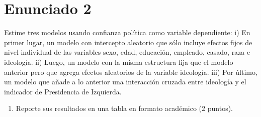 \documentclass[
  12pt,
  a4paper,
]{article}
\providecommand{\tightlist}{%
  \setlength{\itemsep}{0pt}\setlength{\parskip}{0pt}}
\begin{document}
\hypertarget{enunciado-2}{%
\section{Enunciado 2}\label{enunciado-2}}

Estime tres modelos usando confianza política como variable dependiente: i) En primer lugar, un modelo con intercepto aleatorio que sólo incluye efectos fijos de nivel individual de las variables sexo, edad, educación, empleado, casado, raza e ideología. ii) Luego, un modelo con la misma estructura fija que el modelo anterior pero que agrega efectos aleatorios de la variable ideología. iii) Por último, un modelo que añade a lo anterior una interacción cruzada entre ideología y el indicador de Presidencia de Izquierda.

\begin{enumerate}
\def\labelenumi{\alph{enumi})}
\tightlist
\item
  Reporte sus resultados en una tabla en formato académico (2 puntos).
\end{enumerate}
\end{document}
